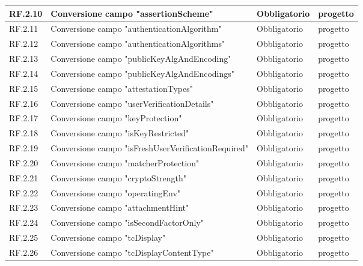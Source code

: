 \begin{center}
\begin{longtable}{|L{2cm}|C{5,5cm}|C{3cm}|C{2cm}|}
    RF.2.10 & Conversione campo "assertionScheme" & Obbligatorio & progetto \\ \hline
    RF.2.11 & Conversione campo "authenticationAlgorithm" & Obbligatorio & progetto \\ \hline
    RF.2.12 & Conversione campo "authenticationAlgorithms" & Obbligatorio & progetto \\ \hline
    RF.2.13 & Conversione campo "publicKeyAlgAndEncoding" & Obbligatorio & progetto \\ \hline
    RF.2.14 & Conversione campo "publicKeyAlgAndEncodings" & Obbligatorio & progetto \\ \hline
    RF.2.15 & Conversione campo "attestationTypes" & Obbligatorio & progetto \\ \hline
    RF.2.16 & Conversione campo "userVerificationDetails" & Obbligatorio & progetto \\ \hline
    RF.2.17 & Conversione campo "keyProtection" & Obbligatorio & progetto \\ \hline
    RF.2.18 & Conversione campo "isKeyRestricted" & Obbligatorio & progetto \\ \hline
    RF.2.19 & Conversione campo "isFreshUserVerificationRequired" & Obbligatorio & progetto \\ \hline
    RF.2.20 & Conversione campo "matcherProtection" & Obbligatorio & progetto \\ \hline
    RF.2.21 & Conversione campo "cryptoStrength" & Obbligatorio & progetto \\ \hline
    RF.2.22 & Conversione campo "operatingEnv" & Obbligatorio & progetto \\ \hline
    RF.2.23 & Conversione campo "attachmentHint" & Obbligatorio & progetto \\ \hline
    RF.2.24 & Conversione campo "isSecondFactorOnly" & Obbligatorio & progetto \\ \hline
    RF.2.25 & Conversione campo "tcDisplay" & Obbligatorio & progetto \\ \hline
    RF.2.26 & Conversione campo "tcDisplayContentType" & Obbligatorio & progetto \\ \hline

\end{longtable}
\end{center}
